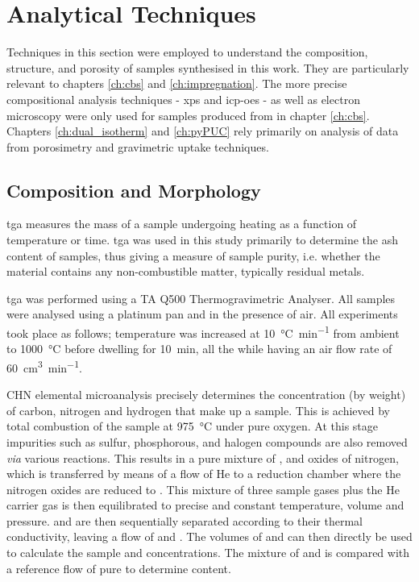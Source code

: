 \section{Analytical Techniques}
Techniques in this section were employed to understand the composition, structure, and porosity of samples synthesised in this work. They are particularly relevant to chapters \ref{ch:cbs} and \ref{ch:impregnation}. The more precise compositional analysis techniques - \acrfull{xps} and \acrfull{icp-oes} - as well as electron microscopy were only used for samples produced from  in chapter \ref{ch:cbs}. Chapters \ref{ch:dual_isotherm} and \ref{ch:pyPUC} rely primarily on analysis of data from porosimetry and gravimetric uptake techniques.

\subsection{Composition and Morphology}

\acrfull{tga} measures the mass of a sample undergoing heating as a function of temperature or time.\citep{coats1963thermogravimetric} \acrshort{tga} was used in this study primarily to determine the \gls{ash content} of samples, thus giving a measure of sample purity,\citep{mcnaught1997compendium} i.e. whether the material contains any non-combustible matter, typically residual metals.

\acrshort{tga} was performed using a TA Q500 Thermogravimetric Analyser. All samples were analysed using a platinum pan and in the presence of air. All experiments took place as follows; temperature was increased at \qty{10}{\degreeCelsius\per\minute} from ambient to \qty{1000}{\degreeCelsius} before dwelling for \qty{10}{\minute}, all the while having an air flow rate of \qty{60}{\cm\cubed\per\minute}.

CHN elemental microanalysis precisely determines the concentration (by weight) of carbon, nitrogen and hydrogen that make up a sample. This is achieved by total combustion of the sample at \qty{975}{\degreeCelsius} under pure oxygen. At this stage impurities such as sulfur, phosphorous, and halogen compounds are also removed \textit{via} various reactions. This results in a pure mixture of ,  and oxides of nitrogen, which is transferred by means of a flow of He to a reduction chamber where the nitrogen oxides are reduced to . This mixture of three sample gases plus the He carrier gas is then equilibrated to precise and constant temperature, volume and pressure.  and  are then sequentially separated according to their thermal conductivity, leaving a flow of  and . The volumes of  and  can then directly be used to calculate the sample  and  concentrations. The mixture of  and  is compared with a reference flow of pure  to determine  content.

